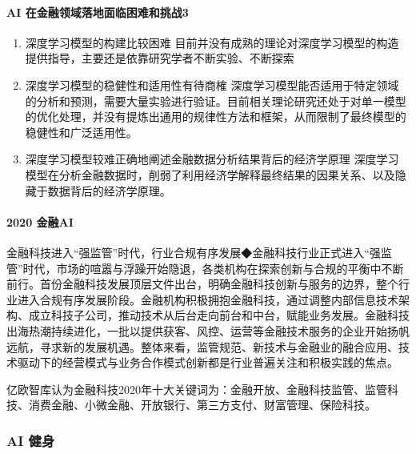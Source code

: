 \documentclass[letterpaper,11pt,english]{sphinxmanual}
\begin{document}
\paragraph{AI 在金融领域落地面临困难和挑战3\sphinxfootnotemark[239]}
\label{\detokenize{chapter_project/AI_Finance:ai-3}}%
\begin{footnotetext}[239]\sphinxAtStartFootnote
{}
%
\end{footnotetext}\ignorespaces \begin{enumerate}
%
\item {} 
深度学习模型的构建比较困难
目前并没有成熟的理论对深度学习模型的构造提供指导，主要还是依靠研究学者不断实验、不断探索

\item {} 
深度学习模型的稳健性和适用性有待商榷
深度学习模型能否适用于特定领域的分析和预测，需要大量实验进行验证。目前相关理论研究还处于对单一模型的优化处理，并没有提炼出通用的规律性方法和框架，从而限制了最终模型的稳健性和广泛适用性。

\item {} 
深度学习模型较难正确地阐述金融数据分析结果背后的经济学原理
深度学习模型在分析金融数据时，削弱了利用经济学解释最终结果的因果关系、以及隐藏于数据背后的经济学原理。

\end{enumerate}


\paragraph{2020 金融AI}
\label{\detokenize{chapter_project/AI_Finance:id5}}
金融科技进入“强监管”时代，行业合规有序发展◆金融科技行业正式进入“强监管”时代，市场的喧嚣与浮躁开始隐退，各类机构在探索创新与合规的平衡中不断前行。首份金融科技发展顶层文件出台，明确金融科技创新与服务的边界，整个行业进入合规有序发展阶段。金融机构积极拥抱金融科技，通过调整内部信息技术架构、成立科技子公司，推动技术从后台走向前台和中台，赋能业务发展。金融科技出海热潮持续进化，一批以提供获客、风控、运营等金融技术服务的企业开始扬帆远航，寻求新的发展机遇。整体来看，监管规范、新技术与金融业的融合应用、技术驱动下的经营模式与业务合作模式创新都是行业普遍关注和积极实践的焦点。

亿欧智库认为金融科技2020年十大关键词为：金融开放、金融科技监管、监管科技、消费金融、小微金融、开放银行、第三方支付、财富管理、保险科技。


\subsubsection{AI 健身}
\label{\detokenize{chapter_project/AI_fit:ai}}\label{\detokenize{chapter_project/AI_fit::doc}}
\end{document}

